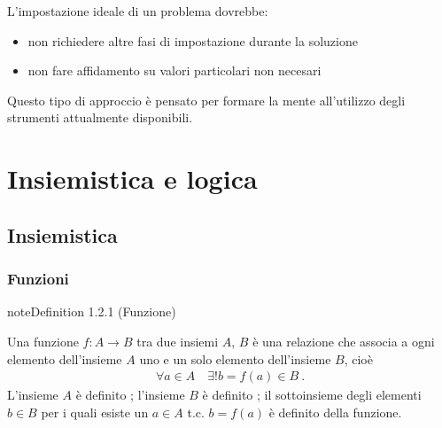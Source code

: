 \documentclass[letterpaper,10pt,italian]{jupyterBook}
\begin{document}
\sphinxAtStartPar
L’impostazione ideale di un problema dovrebbe:
\begin{itemize}
\item {} 
\sphinxAtStartPar
non richiedere altre fasi di impostazione durante la soluzione

\item {} 
\sphinxAtStartPar
non fare affidamento su valori particolari non necesari

\end{itemize}

\sphinxAtStartPar
Questo tipo di approccio è pensato per formare la mente all’utilizzo degli strumenti attualmente disponibili. 

\sphinxstepscope


\part{Insiemistica e logica}

\sphinxstepscope


\chapter{Insiemistica}
\label{\detokenize{ch/set:insiemistica}}\label{\detokenize{ch/set:math-hs-set}}\label{\detokenize{ch/set::doc}}

\section{}
\label{\detokenize{ch/set:id1}}

\section{Funzioni}
\label{\detokenize{ch/set:funzioni}}\label{\detokenize{ch/set:math-hs-fun}}\label{ch/set:set-fun-def}
\begin{sphinxadmonition}{note}{Definition 1.2.1 (Funzione)}



\sphinxAtStartPar
Una funzione \(f: A \rightarrow B\) tra due insiemi \(A\), \(B\) è una relazione che associa a ogni elemento dell’insieme \(A\) uno e un solo elemento dell’insieme \(B\), cioè
\begin{equation*}
\begin{split}\forall a \in A \quad \exists! b = f(a) \in B \ .\end{split}
\end{equation*}
\sphinxAtStartPar
L’insieme \(A\) è definito ; l’insieme \(B\) è definito ; il sottoinsieme degli elementi \(b \in B\) per i quali esiste un \(a \in A\) t.c. \(b = f(a)\) è definito  della funzione.
\end{sphinxadmonition}
\end{document}
